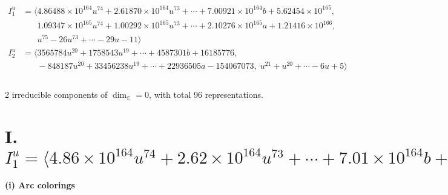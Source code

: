 \documentclass[1p]{elsarticle_modified}
\theoremstyle{definition}
\begin{document}
\begin{align*}
I^u_{1}&=\langle 
4.86488\times10^{164} u^{74}+2.61870\times10^{164} u^{73}+\cdots+7.00921\times10^{164} b+5.62454\times10^{165},\\
\phantom{I^u_{1}}&\phantom{= \langle  }1.09347\times10^{165} u^{74}+1.00292\times10^{165} u^{73}+\cdots+2.10276\times10^{165} a+1.21416\times10^{166},\\
\phantom{I^u_{1}}&\phantom{= \langle  }u^{75}-26 u^{73}+\cdots-29 u-11\rangle \\
I^u_{2}&=\langle 
3565784 u^{20}+1758543 u^{19}+\cdots+4587301 b+16185776,\\
\phantom{I^u_{2}}&\phantom{= \langle  }-848187 u^{20}+33456238 u^{19}+\cdots+22936505 a-154067073,\;u^{21}+u^{20}+\cdots-6 u+5\rangle \\
\\
\end{align*}
\raggedright * 2 irreducible components of $\dim_{\mathbb{C}}=0$, with total 96 representations.\\
\newpage
\renewcommand{\arraystretch}{1}
\centering \section*{I. $I^u_{1}= \langle 4.86\times10^{164} u^{74}+2.62\times10^{164} u^{73}+\cdots+7.01\times10^{164} b+5.62\times10^{165},\;1.09\times10^{165} u^{74}+1.00\times10^{165} u^{73}+\cdots+2.10\times10^{165} a+1.21\times10^{166},\;u^{75}-26 u^{73}+\cdots-29 u-11 \rangle$}
\flushleft \textbf{(i) Arc colorings}\\
\end{document}
